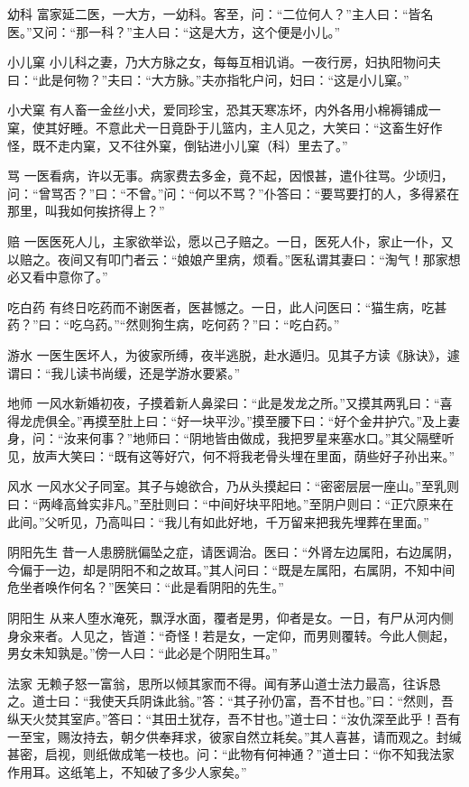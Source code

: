 \documentclass[12pt,UTF8]{ctexbook}
\begin{document}
幼科
富家延二医，一大方，一幼科。客至，问：“二位何人？”主人曰：“皆名医。”又问：“那一科？”主人曰：“这是大方，这个便是小儿。”

小儿窠
小儿科之妻，乃大方脉之女，每每互相讥诮。一夜行房，妇执阳物问夫曰：“此是何物？”夫曰：“大方脉。”夫亦指牝户问，妇曰：“这是小儿窠。”

小犬窠
有人畜一金丝小犬，爱同珍宝，恐其天寒冻坏，内外各用小棉褥铺成一窠，使其好睡。不意此犬一日竟卧于儿篮内，主人见之，大笑曰：“这畜生好作怪，既不走内窠，又不往外窠，倒钻进小儿窠（科）里去了。”

骂
一医看病，许以无事。病家费去多金，竟不起，因恨甚，遣仆往骂。少顷归，问：“曾骂否？”曰：“不曾。”问：“何以不骂？”仆答曰：“要骂要打的人，多得紧在那里，叫我如何挨挤得上？”

赔
一医医死人儿，主家欲举讼，愿以己子赔之。一日，医死人仆，家止一仆，又以赔之。夜间又有叩门者云：“娘娘产里病，烦看。”医私谓其妻曰：“淘气！那家想必又看中意你了。”

吃白药
有终日吃药而不谢医者，医甚憾之。一日，此人问医曰：“猫生病，吃甚药？”曰：“吃乌药。”“然则狗生病，吃何药？”曰：“吃白药。”

游水
一医生医坏人，为彼家所缚，夜半逃脱，赴水遁归。见其子方读《脉诀》，遽谓曰：“我儿读书尚缓，还是学游水要紧。”

地师
一风水新婚初夜，子摸着新人鼻梁曰：“此是发龙之所。”又摸其两乳曰：“喜得龙虎俱全。”再摸至肚上曰：“好一块平沙。”摸至腰下曰：“好个金井护穴。”及上妻身，问：“汝来何事？”地师曰：“阴地皆由做成，我把罗星来塞水口。”其父隔壁听见，放声大笑曰：“既有这等好穴，何不将我老骨头埋在里面，荫些好子孙出来。”

风水
一风水父子同室。其子与媳欲合，乃从头摸起曰：“密密层层一座山。”至乳则曰：“两峰高耸实非凡。”至肚则曰：“中间好块平阳地。”至阴户则曰：“正穴原来在此间。”父听见，乃高叫曰：“我儿有如此好地，千万留来把我先埋葬在里面。”

阴阳先生
昔一人患膀胱偏坠之症，请医调治。医曰：“外肾左边属阳，右边属阴，今偏于一边，却是阴阳不和之故耳。”其人问曰：“既是左属阳，右属阴，不知中间危坐者唤作何名？”医笑曰：“此是看阴阳的先生。”

阴阳生
从来人堕水淹死，飘浮水面，覆者是男，仰者是女。一日，有尸从河内侧身汆来者。人见之，皆道：“奇怪！若是女，一定仰，而男则覆转。今此人侧起，男女未知孰是。”傍一人曰：“此必是个阴阳生耳。”

法家
无赖子怒一富翁，思所以倾其家而不得。闻有茅山道士法力最高，往诉恳之。道士曰：“我使天兵阴诛此翁。”答：“其子孙仍富，吾不甘也。”曰：“然则，吾纵天火焚其室庐。”答曰：“其田土犹存，吾不甘也。”道士曰：“汝仇深至此乎！吾有一至宝，赐汝持去，朝夕供奉拜求，彼家自然立耗矣。”其人喜甚，请而观之。封缄甚密，启视，则纸做成笔一枝也。问：“此物有何神通？”道士曰：“你不知我法家作用耳。这纸笔上，不知破了多少人家矣。”
\end{document}
